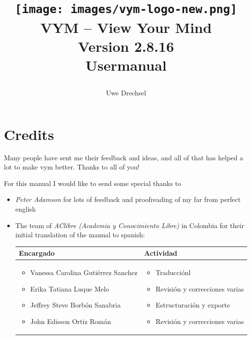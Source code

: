 \documentclass[12pt,a4paper]{article}
\newcommand{\vym}{{\sc vym }}
\begin{document}
\title{
    \texttt{[image: images/vym-logo-new.png]} \\ 
    VYM  -- View Your Mind \\ 
    {\small Version 2.8.16} \\ 
    { Usermanual }
\author{\textcopyright Uwe Drechsel  }
}


\maketitle

\newpage

\tableofcontents

\newpage

\section*{Credits}
Many people have sent me their feedback and ideas, and all of that has
helped a lot to make \vym better. Thanks to all of you!

For this manual I would like to send some special thanks to

\begin{itemize}
    \item {\em Peter Adamson} for lots of feedback and proofreading of my
          far from perfect english
    \item The team of {\em AClibre (Academia y Conocimiento Libre)}
          in Colombia for their initial translation of
          the manual to spanish:
          \begin{center}
            \begin{tabular}{|p{7cm}|p{5.5cm}|} \hline
                Encargado & Actividad \\ \hline
                \begin{itemize}
                   \item Vanessa Carolina Guti\'errez Sanchez
                   \item Erika Tatiana Luque Melo
                   \item Jeffrey Steve Borb\'on Sanabria
                   \item John Edisson Ortiz Rom\'an
                \end{itemize} &
                \begin{itemize}
                    \item Traducci\'onl
                    \item Revisi\'on y correcciones varias
                    \item Estructuraci\'on y exporte
                    \item Revisi\'on y correcciones varias
                \end{itemize}     \\ \hline
            \end{tabular}   
        \end{center}
\end{itemize}
\newpage
\end{document}
